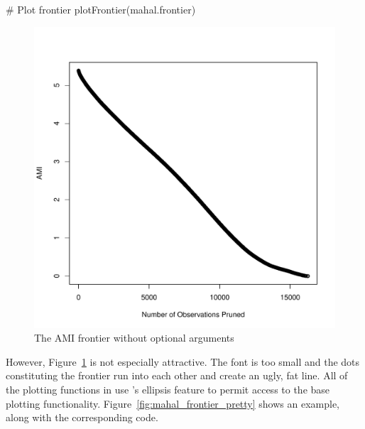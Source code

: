 \documentclass[nojss]{jss}
\begin{document}
\begin{minipage}{0.45\textwidth}
\begin{CodeChunk}
\begin{CodeInput}
# Plot frontier
plotFrontier(mahal.frontier)
\end{CodeInput}
\end{CodeChunk}
\end{minipage}
\begin{minipage}{0.5\textwidth}
\begin{figure}[H]
\includegraphics{mahal_frontier_plain.pdf}
\caption{\label{fig:mahal_frontier_plain} The AMI frontier without optional arguments}
\end{figure}
\end{minipage} \hfill
\newline
\newline
\vspace

However, Figure~\ref{fig:mahal_frontier_plain} is not especially
attractive.  The font is too small and the dots constituting the
frontier run into each other and create an ugly, fat line. All of the
plotting functions in  use 's
ellipsis feature to permit access to the base plotting
functionality. Figure~\ref{fig:mahal_frontier_pretty} shows an
example, along with the corresponding code.
\end{document}
